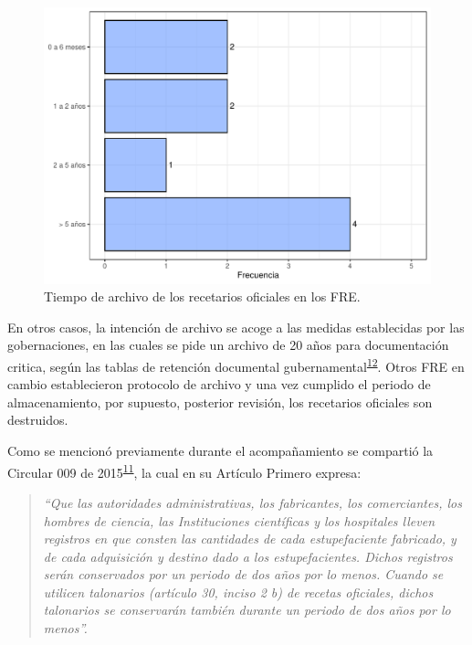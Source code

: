 \documentclass[
]{book}
\begin{document}
\begin{figure}[t]

{\centering \includegraphics[width=0.85\linewidth]{InformeFinal_files/figure-latex/TiempoArchivoRecetariosOficiales-1} 

}

\caption{Tiempo de archivo de los recetarios oficiales en los FRE.}\label{fig:TiempoArchivoRecetariosOficiales}
\end{figure}

En otros casos, la intención de archivo se acoge a las medidas establecidas por las gobernaciones, en las cuales se pide un archivo de 20 años para documentación critica, según las tablas de retención documental gubernamental\textsuperscript{\protect\hyperlink{ref-PresidenciadelaRepublicadeColombia2012}{12}}. Otros FRE en cambio establecieron protocolo de archivo y una vez cumplido el periodo de almacenamiento, por supuesto, posterior revisión, los recetarios oficiales son destruidos.

Como se mencionó previamente durante el acompañamiento se compartió la Circular 009 de 2015\textsuperscript{\protect\hyperlink{ref-FNE2015-9}{11}}, la cual en su Artículo Primero expresa:

\begin{quote}
\emph{``Que las autoridades administrativas, los fabricantes, los comerciantes, los hombres de ciencia, las Instituciones científicas y los hospitales lleven registros en que consten las cantidades de cada estupefaciente fabricado, y de cada adquisición y destino dado a los estupefacientes. Dichos registros serán conservados por un periodo de dos años por lo menos. Cuando se utilicen talonarios (artículo 30, inciso 2 b) de recetas oficiales, dichos talonarios se conservarán también durante un periodo de dos años por lo menos''.}
\end{quote}
\end{document}
